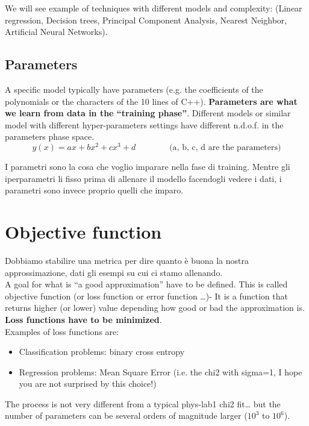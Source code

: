 We will see example of techniques with different models and complexity: (Linear regression, Decision trees, Principal Component Analysis, Nearest Neighbor, Artificial Neural Networks).

\subsection{Parameters}

A specific model typically have parameters (e.g. the coefficients of the polynomials or the characters of the 10 lines of C++).
\textbf{Parameters are what we learn from data in the “training phase”}.
Different models or similar model with different hyper-parameters settings have different n.d.o.f. in the parameters phase space.
\begin{equation*}
	y(x) = ax + bx^2 + cx^3 + d \qquad \qquad	\text{(a, b, c, d are the parameters)}
\end{equation*}

I parametri sono la cosa che voglio imparare nella fase di training. Mentre gli iperparametri li fisso prima di allenare il modello facendogli vedere i dati, i parametri sono invece proprio quelli che imparo.

\section{Objective function}
Dobbiamo stabilire una metrica per dire quanto è buona la nostra approssimazione, dati gli esempi su cui ci stamo allenando.\\

A goal for what is “a good approximation” have to be defined. This is called objective function (or loss function or error function …)- It is a function that returns higher (or lower) value depending how good or bad the approximation is. \textbf{Loss functions have to be minimized}.\\
Examples of loss functions are:
\begin{itemize}
	\item Classification problems: binary cross entropy
	\item Regression problems: Mean Square Error (i.e. the chi2 with sigma=1, I hope you are not surprised by this choice!)
\end{itemize}

The process is not very different from a typical phys-lab1 chi2 fit… but the number
of parameters can be several orders of magnitude larger ($10^3$ to $10^6$).\\



